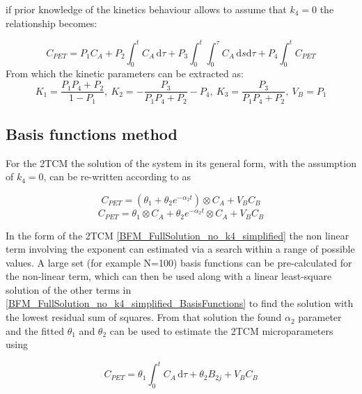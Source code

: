 \newline 
if prior knowledge of the kinetics behaviour allows to assume that $k_{4} = 0 $ the relationship becomes: 

\begin{equation} \label{microLinearization_no_k4}
C_{PET} = P_1 C_A + P_2 \int_0^t \! C_A \, \mathrm{d}\tau + P_3 \int_0^t \int_0^\tau \! C_A \,\mathrm{d}s \mathrm{d}\tau
+ P_4 \int_0^t \! C_{PET} 
\end{equation}
\newline From which the kinetic parameters can be extracted as: 
\newline
\begin{equation} \label{ParamsLinearization_no_k4}
K_1=\frac{P_1 P_4 + P_2}{1-P_1} ,\  K_2=- \frac{P_3}{P_1 P_4 + P_2} - P_4 ,\ K_3=\frac{P_3}{P_1 P_4 + P_2} ,\  V_B = P_1
\end{equation}

\subsection{Basis functions method}
For the 2TCM the solution of the system in its general form, with the assumption of $k_4 = 0$, can be re-written according to \cite{Hong2010} as 

\begin{equation} \label{BFM_FullSolution_no_k4}
C_{PET} = (\theta_1 + \theta_2 e^{-\alpha_2 t } ) \otimes C_A + V_B C_B
\end{equation}
\begin{equation} \label{BFM_FullSolution_no_k4_simplified}
C_{PET} = \theta_1 \otimes C_A + \theta_2 e^{-\alpha_2 t } \otimes C_A   + V_B C_B
\end{equation}

In the form of the 2TCM \ref{BFM_FullSolution_no_k4_simplified} the non linear term involving the exponent can estimated via a search within a range of possible values. A large set (for example N=100) basis functions can be pre-calculated for the non-linear term, which can then be used along with a linear least-square solution of the other terms in \ref{BFM_FullSolution_no_k4_simplified_BasisFunctions} to find the solution with the lowest residual sum of squares. From that solution the found $\alpha_2$ parameter and the fitted $\theta_1$ and $\theta_2$ can be used to estimate the 2TCM microparameters using

\begin{equation} \label{BFM_FullSolution_no_k4_simplified_BasisFunctions}
C_{PET} = \theta_1 \int_0^t \! C_A \, \mathrm{d}\tau + \theta_2 B_{2j}   + V_B C_B
\end{equation}

